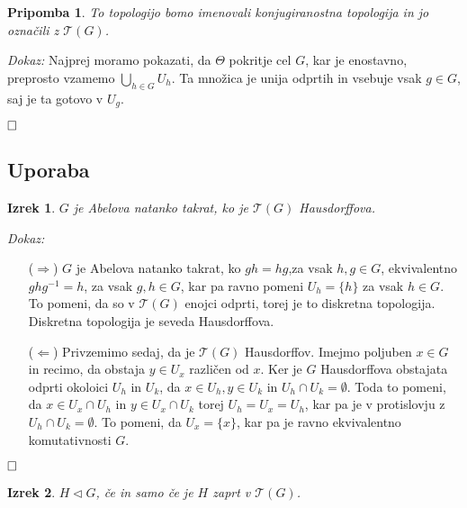 \documentclass[a4paper,12pt]{article}
\def\qed{$\hfill\Box$}   %
\newtheorem{izrek}{Izrek}
\newtheorem{pripomba}{Pripomba}
\begin{document}
\begin{pripomba}
    To topologijo bomo imenovali \emph{konjugiranostna topologija} in jo označili z $\mathcal{T}(G)$.
\end{pripomba}


\noindent
{\em Dokaz:\/}
    Najprej moramo pokazati, da $\Theta$ pokritje cel $G$, kar je enostavno, preprosto vzamemo $\bigcup_{h \in G}U_h$.
    Ta množica je unija odprtih in vsebuje vsak $g \in G$, saj je ta gotovo v $U_g$.

\qed





\subsection{Uporaba}



\begin{izrek}
    $G$ je Abelova natanko takrat, ko je $\mathcal{T}(G)$ Hausdorffova.
\end{izrek}

\noindent
{\em Dokaz:\/}
    \begin{itemize}
        \item[($\Rightarrow$)] $G$ je Abelova natanko takrat, ko $gh = hg $,za vsak $h,g \in G$, ekvivalentno $ghg^{-1} = h$, za vsak $g,h \in G$, kar pa ravno pomeni $U_h = \{ h\}$ za vsak $h \in G$.
        To pomeni, da so v $\mathcal{T}(G)$ enojci odprti, torej je to diskretna topologija. Diskretna topologija je seveda Hausdorffova.
        \item[($\Leftarrow$)] Privzemimo sedaj, da je $\mathcal{T}(G)$ Hausdorffov. Imejmo poljuben $x \in G$ in recimo, da obstaja $y \in U_x$ različen od $x$.
        Ker je $G$ Hausdorffova obstajata odprti okoloici $U_h$ in $U_k$, da $x \in U_h, y \in U_k$ in $U_h \cap U_k = \emptyset$.
        Toda to pomeni, da $x \in U_x \cap U_h$ in $y \in U_x \cap U_k$ torej $U_h = U_x = U_h$, kar pa je v protislovju z $U_h \cap U_k = \emptyset$.
        To pomeni, da $U_x = \{x\}$, kar pa je ravno ekvivalentno komutativnosti $G$.
    \end{itemize} 
\qed


\begin{izrek}
    $H \triangleleft G$, če in samo če je $H$ zaprt v $\mathcal{T}(G)$.
\end{izrek}
\end{document}
